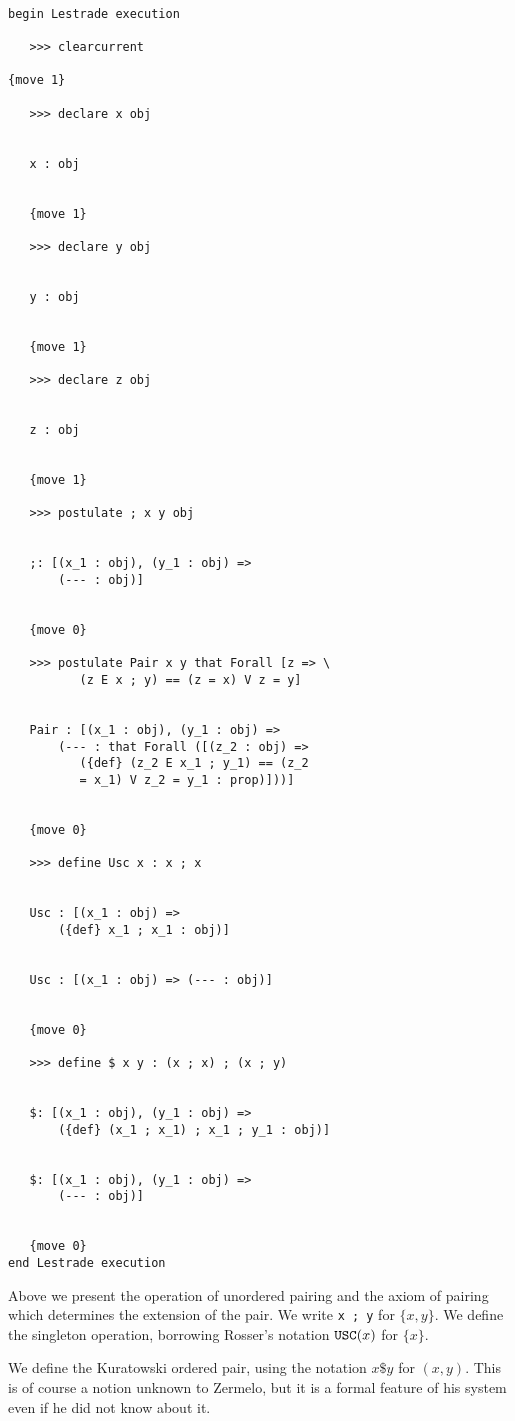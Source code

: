 \documentclass[12pt]{article}
\begin{document}
\begin{verbatim}

begin Lestrade execution

   >>> clearcurrent

{move 1}

   >>> declare x obj


   x : obj


   {move 1}

   >>> declare y obj


   y : obj


   {move 1}

   >>> declare z obj


   z : obj


   {move 1}

   >>> postulate ; x y obj


   ;: [(x_1 : obj), (y_1 : obj) => 
       (--- : obj)]


   {move 0}

   >>> postulate Pair x y that Forall [z => \
          (z E x ; y) == (z = x) V z = y]


   Pair : [(x_1 : obj), (y_1 : obj) => 
       (--- : that Forall ([(z_2 : obj) => 
          ({def} (z_2 E x_1 ; y_1) == (z_2 
          = x_1) V z_2 = y_1 : prop)]))]


   {move 0}

   >>> define Usc x : x ; x


   Usc : [(x_1 : obj) => 
       ({def} x_1 ; x_1 : obj)]


   Usc : [(x_1 : obj) => (--- : obj)]


   {move 0}

   >>> define $ x y : (x ; x) ; (x ; y)


   $: [(x_1 : obj), (y_1 : obj) => 
       ({def} (x_1 ; x_1) ; x_1 ; y_1 : obj)]


   $: [(x_1 : obj), (y_1 : obj) => 
       (--- : obj)]


   {move 0}
end Lestrade execution
\end{verbatim}

Above we present the operation of unordered pairing and the axiom of pairing which determines the extension of the pair.  We write {\tt x ; y} for $\{x,y\}$.  We define
 the singleton operation, borrowing Rosser's notation ${\tt USC}(x)$ for $\{x\}$.

We define the Kuratowski ordered pair, using the notation $x \$ y$ for $(x,y)$.  This is of course a notion unknown to Zermelo, but it is a formal feature of his system even if he did not know about it.
\end{document}
